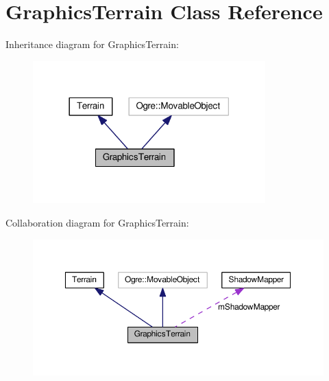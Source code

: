\hypertarget{class_graphics_terrain}{}\section{Graphics\+Terrain Class Reference}
\label{class_graphics_terrain}


Inheritance diagram for Graphics\+Terrain\+:\nopagebreak
\begin{figure}[H]
\begin{center}
\leavevmode
\includegraphics[width=254pt]{class_graphics_terrain__inherit__graph}
\end{center}
\end{figure}


Collaboration diagram for Graphics\+Terrain\+:\nopagebreak
\begin{figure}[H]
\begin{center}
\leavevmode
\includegraphics[width=350pt]{class_graphics_terrain__coll__graph}
\end{center}
\end{figure}
